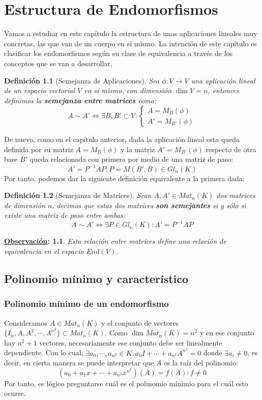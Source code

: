 \documentclass[10pt,a4paper,openright]{book}
\theoremstyle{break}
\newtheorem*{defi}{Definición}
\newtheorem*{obs}{\underline{Observación}:}
\begin{document}
\chapter{Estructura de Endomorfismos}
Vamos a estudiar en este capítulo la estructura de unas aplicaciones lineales muy concretas, las que van de un cuerpo en sí mismo. La intención de este capítulo es clasificar los endomorfismos según su clase de equivalencia a través de los conceptos que se van a desarrollar.

\begin{defi}[Semejanza de Aplicaciones]
Sea $\phi: V\rightarrow V$ una aplicación lineal de un espacio vectorial $V$ en sí mismo, con dimensión $\dim V = n$, entonces definimos la \textbf{semejanza entre matrices} como:
$$A\sim A' \Leftrightarrow \exists B, B'\subset V : \begin{cases}
A=M_{B}(\phi) \\ A'=M_{B'}(\phi) \end{cases}$$
\end{defi}
De nuevo, como en el capítulo anterior, dada la aplicación lineal esta queda definida por su matriz $A=M_B(\phi)$ y la matriz $A'=M_{B'}(\phi)$ respecto de otra base $B'$ queda relacionada con primera por medio de una matriz de paso:
$$A'= P^{-1}AP: P=M(B',B)\in Gl_n(K)$$
Por tanto, podemos dar la siguiente definición equivalente a la primera dada:
\begin{defi}[Semejanza de Matrices]
Sean $A,A'\in Mat_{n}(K)$ dos matrices de dimensión $n$, decimos que estas dos matrices \textbf{son semejantes} si y sólo si existe una matriz de paso entre ambas:
$$A\sim A' \Leftrightarrow \exists P \in Gl_n(K) : A' = P^{-1}AP$$
\end{defi}

\begin{obs}
Esta relación entre matrices define una relación de equivalencia en el espacio $End(V)$.
\end{obs}

\section{Polinomio mínimo y característico}
\subsection{Polinomio mínimo de un endomorfismo}
Consideramos $A\in Mat_n(K)$ y el conjunto de vectores $\{I_n, A, A^2, \cdots, A^{n^2}\}\subset Mat_n(K)$. Como $\dim Mat_n(K)= n^2$ y en ese conjunto hay $n^2+1$ vectores, necesariamente ese conjunto debe ser linealmente dependiente. Con lo cual, $\exists a_0, \cdots, a_{n^2}\in K: a_0I+\cdots+a_{n^2}A^{n^2}=0$ donde $\exists a_i \neq 0$, es decir, en cierta manera se puede interpretar que $A$ es la raíz del polinomio:
$$(a_0+a_1x+\cdots+a_{n^2}x^{n^2})(A)=f(A): f\neq 0$$
Por tanto, es lógico preguntarse cuál es el polinomio mínimio para el cuál esto ocurre.
\end{document}
